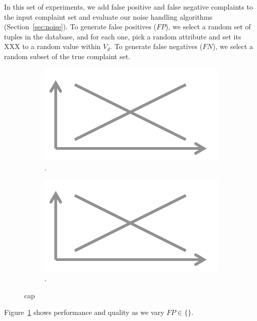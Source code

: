 In this set of experiments, we add false positive and false negative complaints to the input
complaint set and evaluate our noise handling algorithms (Section~\ref{sec:noise}).
To generate false positives ($FP$), we select a random set of tuples in the database, and for each one, 
pick a random attribute and set its XXX to a random value within $V_d$.
To generate false negatives ($FN$), we select a random subset of the true complaint set.


\begin{figure}[h]
\centering
  \begin{subfigure}[t]{.48\columnwidth}
  \includegraphics[width = .95\columnwidth]{figures/placeholder}
  \caption{.}
  \label{f:falsepositive} 
  \end{subfigure}
  \begin{subfigure}[t]{.48\columnwidth}
  \includegraphics[width = .95\columnwidth]{figures/placeholder}
  \caption{.}
  \label{f:falsenegative} 
  \end{subfigure}
  \caption{cap}

\end{figure}



Figure~\ref{f:falsepositive} shows \sys performance and quality as we vary $FP \in \{\}$.

